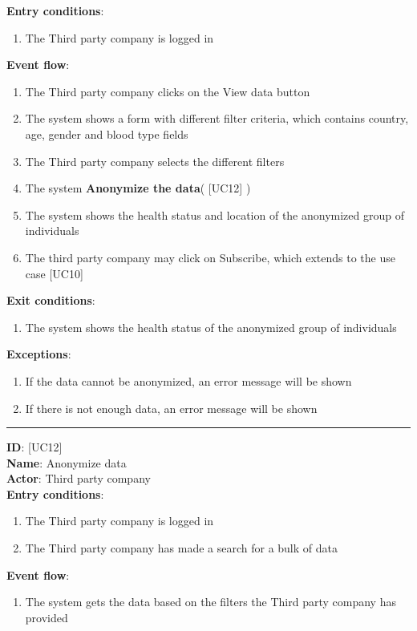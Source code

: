 \documentclass[12pt]{report}
\newcommand\usecase[1]{ [UC#1] }
\begin{document}
\begin{itemize}
    \textbf{Entry conditions}:
    		\begin{enumerate}
    			\item{The Third party company is logged in}
  		\end{enumerate}
  	\textbf{Event flow}:
  		\begin{enumerate}
    			\item{The Third party company clicks on the View data button}
    			\item{The system shows a form with different filter criteria, which contains country, age, gender and blood type fields}
    			\item{The Third party company selects the different filters}
    			\item{The system \textbf{Anonymize the data}(\usecase{12})}
    			\item{The system shows the health status and location of the anonymized group of individuals}
    			\item{The third party company may click on Subscribe, which extends to the use case \usecase{10}}
  		\end{enumerate}
  	\textbf{Exit conditions}:
  		\begin{enumerate}
    			\item{The system shows the health status of the anonymized group of individuals}
  		\end{enumerate}
  	\textbf{Exceptions}: 
  		\begin{enumerate}
    			\item{If the data cannot be anonymized, an error message will be shown}
    			\item{If there is not enough data, an error message will be shown}
  		\end{enumerate}
  	\rule{\linewidth}{0.4pt}	
  	\textbf{ID}: \usecase{12} \\
  	\textbf{Name}: Anonymize data \\
    \textbf{Actor}: Third party company \\
    \textbf{Entry conditions}:
    		\begin{enumerate}
    			\item{The Third party company is logged in}
    			\item{The Third party company has made a search for a bulk of data}
  		\end{enumerate}
  	\textbf{Event flow}:
  		\begin{enumerate}
    			\item{The system gets the data based on the filters the Third party company has provided}

\end{enumerate}
\end{itemize}
\end{document}
